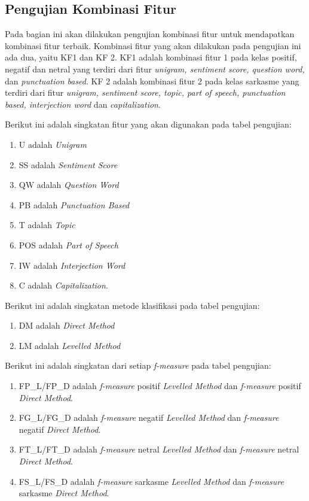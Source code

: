\subsection{Pengujian Kombinasi Fitur}
Pada bagian ini akan dilakukan pengujian kombinasi fitur untuk mendapatkan kombinasi fitur\textit{ }terbaik. Kombinasi fitur yang akan dilakukan pada pengujian ini ada dua, yaitu KF1 dan KF 2. KF1 adalah kombinasi fitur 1 pada kelas positif, negatif dan netral yang terdiri dari fitur \textit{unigram, sentiment score, question word, }
dan \textit{punctuation based}. KF 2 adalah kombinasi fitur 2 pada kelas sarkasme yang terdiri dari fitur \textit{unigram, sentiment score, topic, part of speech, punctuation based, interjection word} dan \textit{capitalization}. 

\noindent Berikut ini adalah singkatan fitur yang akan digunakan pada tabel 
pengujian:
\begin{enumerate}[leftmargin=*]
	\item U adalah \textit{Unigram}
	\item SS adalah \textit{Sentiment Score}
	\item QW adalah \textit{Question Word}
	\item PB adalah \textit{Punctuation Based}
	\item T adalah \textit{Topic}
	\item POS adalah \textit{Part of Speech}
	\item IW adalah \textit{Interjection Word}
	\item C adalah \textit{Capitalization}.
\end{enumerate}
Berikut ini adalah singkatan metode klasifikasi pada tabel pengujian:
\begin{enumerate}[leftmargin=*]
	\item DM adalah \textit{Direct Method}
	\item LM adalah \textit{Levelled Method}
\end{enumerate}
Berikut ini adalah singkatan dari setiap \textit{f-measure} pada tabel 
pengujian:
\begin{enumerate}[leftmargin=*]
	\item FP\_L/FP\_D adalah \textit{f-measure }positif \textit{Levelled 
		Method }dan \textit{f-measure }positif \textit{Direct Method}.
	\item FG\_L/FG\_D adalah \textit{f-measure }negatif \textit{Levelled 
		Method }dan \textit{f-measure }negatif \textit{Direct Method}.
	\item FT\_L/FT\_D adalah \textit{f-measure }netral \textit{Levelled 
		Method }dan \textit{f-measure }netral \textit{Direct Method}.
	\item FS\_L/FS\_D adalah \textit{f-measure }sarkasme \textit{Levelled 
		Method }dan \textit{f-measure }sarkasme \textit{Direct Method}.
\end{enumerate}


